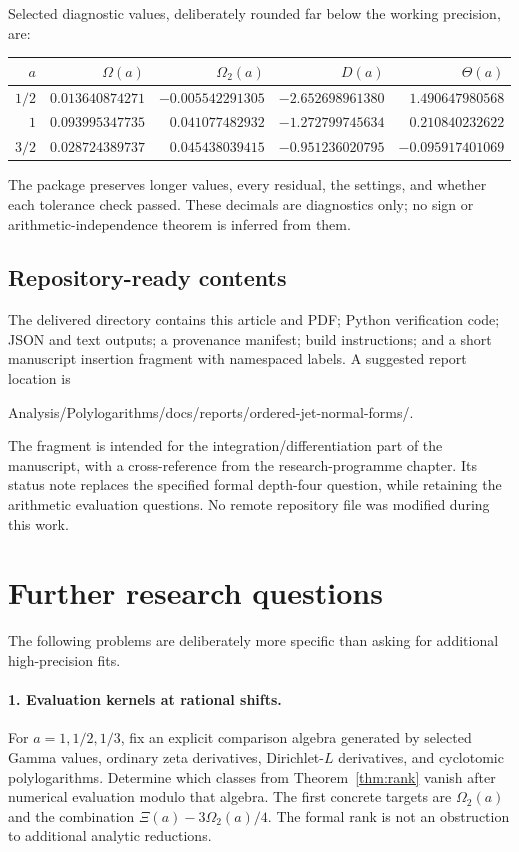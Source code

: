 \documentclass[11pt]{article}
\numberwithin{equation}{section}
\theoremstyle{definition}
\begin{document}
Selected diagnostic values, deliberately rounded far below the working
precision, are:
\begin{center}\small
\begin{tabular}{r r r r r}
\toprule
$a$&$\Omega(a)$&$\Omega_2(a)$&$D(a)$&$\Theta(a)$\\
\midrule
$1/2$&$0.013640874271$&$-0.005542291305$&$-2.652698961380$&$1.490647980568$\\
$1$&$0.093995347735$&$0.041077482932$&$-1.272799745634$&$0.210840232622$\\
$3/2$&$0.028724389737$&$0.045438039415$&$-0.951236020795$&$-0.095917401069$\\
\bottomrule
\end{tabular}
\end{center}
The package preserves longer values, every residual, the settings, and
whether each tolerance check passed. These decimals are diagnostics only;
no sign or arithmetic-independence theorem is inferred from them.

\subsection{Repository-ready contents}
The delivered directory contains this article and PDF; Python verification
code; JSON and text outputs; a provenance manifest; build instructions;
and a short manuscript insertion fragment with namespaced labels. A
suggested report location is
\begin{center}\small\ttfamily
Analysis/Polylogarithms/docs/reports/ordered-jet-normal-forms/.
\end{center}
The fragment is intended for the integration/differentiation part of the
manuscript, with a cross-reference from the research-programme chapter.
Its status note replaces the specified formal depth-four question, while
retaining the arithmetic evaluation questions. No remote repository file
was modified during this work.

\section{Further research questions}
\label{sec:future}
The following problems are deliberately more specific than asking for
additional high-precision fits.

\paragraph{1. Evaluation kernels at rational shifts.}
For $a=1,1/2,1/3$, fix an explicit comparison algebra generated by selected
Gamma values, ordinary zeta derivatives, Dirichlet-$L$ derivatives, and
cyclotomic polylogarithms. Determine which classes from
Theorem~\ref{thm:rank} vanish after numerical evaluation modulo that
algebra. The first concrete targets are $\Omega_2(a)$ and the combination
$\Xi(a)-3\Omega_2(a)/4$. The formal rank is not an obstruction to
additional analytic reductions.
\end{document}
